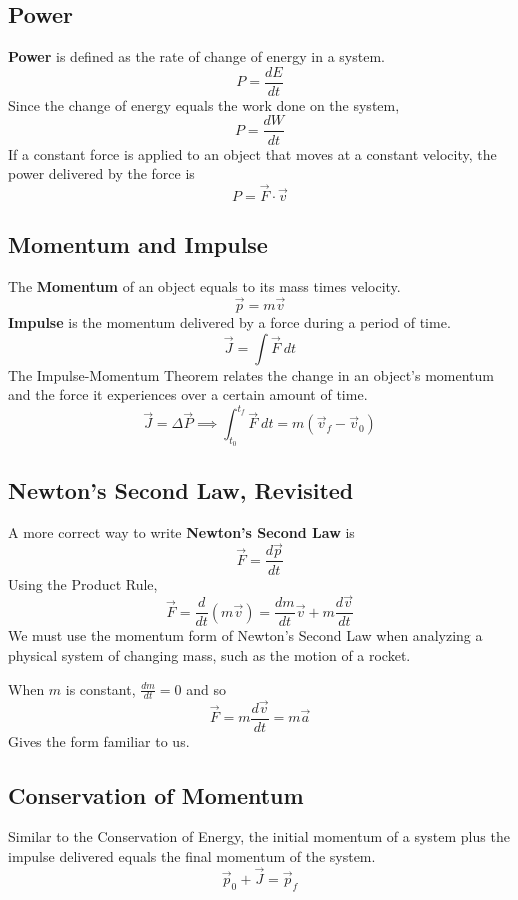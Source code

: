 \documentclass[11pt]{article}
\theoremstyle{gangnamstyle}{\newtheorem{definition}{Definition}[]}
\theoremstyle{gangnamstyle}{\newtheorem{example}{Example}[]}
\theoremstyle{gangnamstyle}{\newtheorem{problem}{Problem}[]}
\begin{document}
\subsection{Power}

\textbf{Power} is defined as the rate of change of energy in a system. 
\[ P = \frac{dE}{dt} \]
Since the change of energy equals the work done on the system, 
\[ P = \frac{dW}{dt} \]
If a constant force is applied to an object that moves at a constant velocity, the power delivered by the force is 
\[ P = \Vec{F} \cdot \Vec{v} \]

\subsection{Momentum and Impulse}

The \textbf{Momentum} of an object equals to its mass times velocity. 
\[ \Vec{p} = m\Vec{v} \]
\textbf{Impulse} is the momentum delivered by a force during a period of time. 
\[ \Vec{J} = \int \Vec{F} \ dt \]
The Impulse-Momentum Theorem relates the change in an object's momentum and the force it experiences over a certain amount of time. 
\[ \Vec{J} = \Delta \Vec{P} \implies \int_{t_0}^{t_f} \Vec{F} \ dt = m(\Vec{v}_f - \Vec{v}_0) \]

\pagebreak

\subsection{Newton's Second Law, Revisited}

A more correct way to write \textbf{Newton's Second Law} is
\[ \Vec{F} = \frac{d\Vec{p}}{dt} \]
Using the Product Rule, 
\[ \Vec{F} = \frac{d}{dt}(m\Vec{v}) = \frac{dm}{dt}\Vec{v} + m \frac{d\Vec{v}}{dt} \]
We must use the momentum form of Newton's Second Law when analyzing a physical system of changing mass, such as the motion of a rocket. 

When $m$ is constant, $\frac{dm}{dt} = 0$ and so
\[ \Vec{F} = m \frac{d\Vec{v}}{dt} = m \Vec{a} \]
Gives the form familiar to us. 

\subsection{Conservation of Momentum}

Similar to the Conservation of Energy, the initial momentum of a system plus the impulse delivered equals the final momentum of the system. 
\[ \Vec{p}_0 + \Vec{J} = \Vec{p}_f \]
\end{document}
